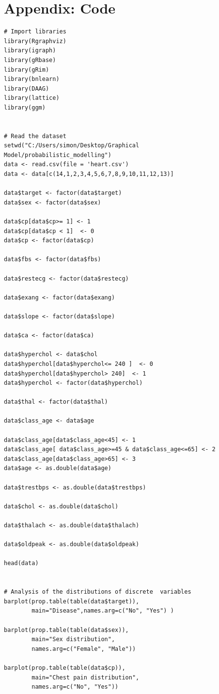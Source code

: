 \documentclass{article}
\begin{document}
\section{Appendix: Code}
\begin{verbatim}
# Import libraries
library(Rgraphviz)
library(igraph)
library(gRbase)
library(gRim)
library(bnlearn)
library(DAAG)
library(lattice)
library(ggm) 


# Read the dataset
setwd("C:/Users/simon/Desktop/Graphical Model/probabilistic_modelling")
data <- read.csv(file = 'heart.csv')
data <- data[c(14,1,2,3,4,5,6,7,8,9,10,11,12,13)]

data$target <- factor(data$target)
data$sex <- factor(data$sex)

data$cp[data$cp>= 1] <- 1
data$cp[data$cp < 1]  <- 0
data$cp <- factor(data$cp)

data$fbs <- factor(data$fbs)

data$restecg <- factor(data$restecg)

data$exang <- factor(data$exang)

data$slope <- factor(data$slope)

data$ca <- factor(data$ca)

data$hyperchol <- data$chol
data$hyperchol[data$hyperchol<= 240 ]  <- 0
data$hyperchol[data$hyperchol> 240]  <- 1
data$hyperchol <- factor(data$hyperchol)

data$thal <- factor(data$thal)

data$class_age <- data$age

data$class_age[data$class_age<45] <- 1
data$class_age[ data$class_age>=45 & data$class_age<=65] <- 2
data$class_age[data$class_age>65] <- 3
data$age <- as.double(data$age)

data$trestbps <- as.double(data$trestbps)

data$chol <- as.double(data$chol)

data$thalach <- as.double(data$thalach)

data$oldpeak <- as.double(data$oldpeak)

head(data)


# Analysis of the distributions of discrete  variables
barplot(prop.table(table(data$target)),
        main="Disease",names.arg=c("No", "Yes") )
        
barplot(prop.table(table(data$sex)), 
        main="Sex distribution",  
        names.arg=c("Female", "Male"))
        
barplot(prop.table(table(data$cp)),
        main="Chest pain distribution",  
        names.arg=c("No", "Yes"))
        

\end{verbatim}
\end{document}
